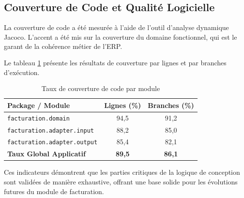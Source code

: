 \subsection{Couverture de Code et Qualité Logicielle}
La couverture de code a été mesurée à l'aide de l'outil d'analyse dynamique Jacoco. L'accent a été mis sur la couverture du domaine fonctionnel, qui est le garant de la cohérence métier de l'ERP.

Le tableau \ref{tab:code_coverage} présente les résultats de couverture par lignes et par branches d'exécution.

\begin{table}[htbp]
\centering
\caption{Taux de couverture de code par module}
\label{tab:code_coverage}
\begin{tabular}{lcc}
\toprule
\textbf{Package / Module} & \textbf{Lignes (\%)} & \textbf{Branches (\%)} \\
\midrule
\texttt{facturation.domain} & 94,5 & 91,2 \\
\texttt{facturation.adapter.input} & 88,2 & 85,0 \\
\texttt{facturation.adapter.output} & 85,4 & 82,1 \\
\textbf{Taux Global Applicatif} & \textbf{89,5} & \textbf{86,1} \\
\bottomrule
\end{tabular}
\end{table}

Ces indicateurs démontrent que les parties critiques de la logique de conception sont validées de manière exhaustive, offrant une base solide pour les évolutions futures du module de facturation.
